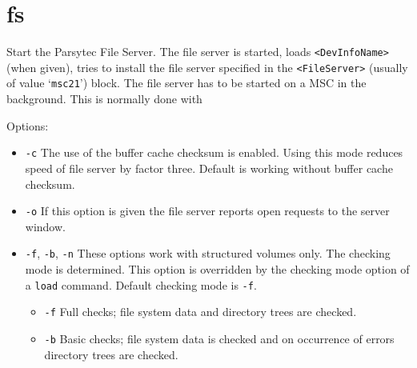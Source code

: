 \section{fs}
\begin{man}
  \PP Start the Parsytec File Server.
  \DE The file server is started, loads {\tt <DevInfoName>} (when given), tries
             to install the file server specified in the {\tt <FileServer>} (usually of 
             value `{\tt msc21}') block. The file server has to be started on a MSC in the
             background. This is normally done with

             \bigskip
             \bigskip

             Options:
             \begin{itemize}

             \item {\tt -c}\newline
               The use of the buffer cache checksum is enabled. Using this mode
               reduces speed of file server by factor three.
	       Default is working without buffer cache checksum.

             \item {\tt -o}\newline
               If this option is given the file server reports open requests
               to the server window.

             \item {\tt -f}, {\tt -b}, {\tt -n}\newline
               These options work with structured volumes only.
	       The checking mode is determined. This option is overridden by 
               the checking mode option of a {\tt load} command. Default checking
               mode is {\tt -f}.

               \begin{itemize}

               \item {\tt -f}\newline
                 Full checks; file system data and directory trees are checked.

               \item {\tt -b}\newline
                 Basic checks; file system data is checked and on occurrence of
	         errors directory trees are checked.


\end{itemize}
\end{itemize}
\end{man}
